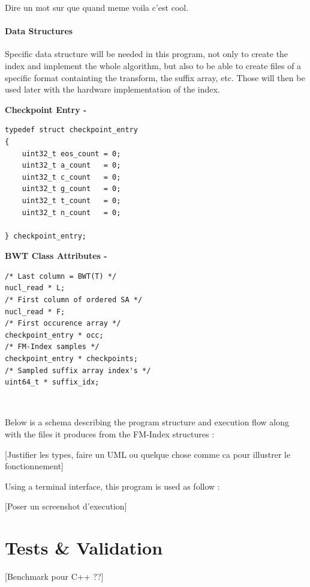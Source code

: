 Dire un mot sur que quand meme voila c'est cool.
	

\paragraph{Data Structures}

Specific data structure will be needed in this program, not only to create the index and implement the whole algorithm, but also to be able to create files of a specific format containting the transform, the suffix array, etc. Those will then be used later with the hardware implementation of the index.

\begin{minipage}[t]{0.4\textwidth}
	\textbf{Checkpoint Entry -} \\
	\vspace{-5mm}
	\begin{verbatim}   
typedef struct checkpoint_entry
{
    uint32_t eos_count = 0;
    uint32_t a_count   = 0;
    uint32_t c_count   = 0;
    uint32_t g_count   = 0;
    uint32_t t_count   = 0;
    uint32_t n_count   = 0;
	
} checkpoint_entry;
	\end{verbatim}
\end{minipage}
\hspace*{15mm}
\begin{minipage}[t]{0.5\textwidth}
		\textbf{BWT Class Attributes - }
\begin{verbatim}
/* Last column = BWT(T) */
nucl_read * L;
/* First column of ordered SA */
nucl_read * F;	
/* First occurence array */
checkpoint_entry * occ;	
/* FM-Index samples */
checkpoint_entry * checkpoints; 
/* Sampled suffix array index's */
uint64_t * suffix_idx;	

	\end{verbatim}
	\textcolor{white}{.}\\

	
	
\end{minipage}
\vspace*{4mm}
Below is a schema describing the program structure and execution flow along with the files it produces from the FM-Index structures :

[Justifier les types, faire un UML ou quelque chose comme ca pour illustrer le fonctionnement]

Using a terminal interface, this program is used as follow :

[Poser un screenshot d'execution]


\section{Tests \& Validation}

[Benchmark pour C++ ??]
